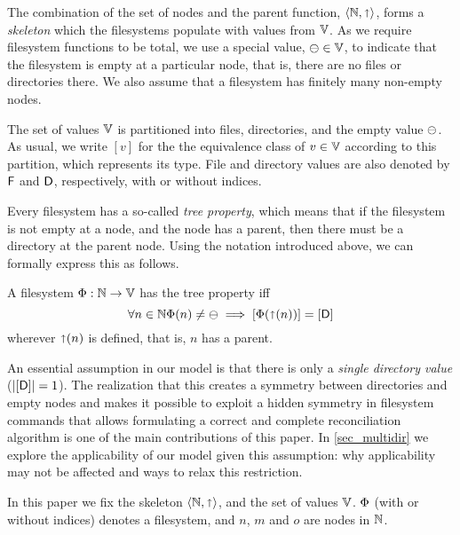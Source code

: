 The combination of the set of nodes and the parent function,
$\langle \mathbb{N}, \mathord{\shortuparrow} \rangle$, forms a \emph{skeleton}
which the filesystems populate with values from $\mathbb{V}$.
As we require filesystem functions to be total,
we use a special value, $\ominus\in\mathbb{V}$, to indicate that the filesystem
is empty at a particular node, that is, there are no files or directories there.
We also assume that a filesystem has finitely many non-empty nodes.

\begin{mydef}
The set of values $\mathbb{V}$ is partitioned into files, directories, and the empty value $\ominus$.
As usual, we write $[v]$ for the the equivalence class of $v\in\mathbb{V}$ according to this partition,
which represents its type.
File and directory values are also denoted by $\mathsf{F}$ and $\mathsf{D}$, respectively,
with or without indices.
\end{mydef}


Every filesystem has a so-called \emph{tree property}, which means that
if the filesystem is not empty at a node, and the node has a parent,
then there must be a directory at the parent node.
Using the notation introduced above, we can formally express this as follows.
\begin{mydef}
A filesystem $\Phi:\mathbb{N} \rightarrow \mathbb{V}$ has the tree property iff
\[ \forall n\in\mathbb{N}
\Phi(n) \neq \ominus \; \Longrightarrow \; [\Phi(\mathord{\shortuparrow}({n}))] = [\mathsf{D}] \]
wherever $\mathord{\shortuparrow}(n)$ is defined, that is, $n$ has a parent.
\end{mydef}


An essential assumption in our model is that there is only
a \emph{single directory value} ($|[\mathsf{D}]|=1$).
The realization that
this creates a symmetry between directories and empty nodes
and makes it possible to exploit a hidden symmetry in filesystem commands
that allows formulating a correct and complete reconciliation algorithm
is one of the main contributions of this paper.
In \cref{sec_multidir} we explore the applicability of our model given this assumption:
why applicability may not be affected and ways to relax this restriction.


\myskip
In this paper
we fix the skeleton $\langle\mathbb{N},\mathord{\shortuparrow}\rangle$,
and the set of values $\mathbb{V}$.
$\Phi$ (with or without indices) denotes a filesystem,
and $n$, $m$ and $o$ are nodes in $\mathbb{N}$.
